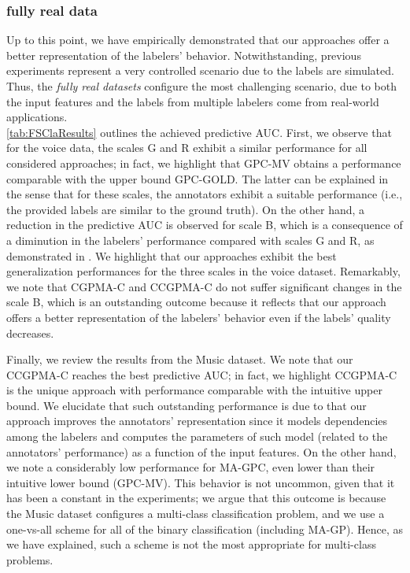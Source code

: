 \documentclass[journal]{IEEEtran}
\begin{document}
\subsubsection{fully real data}
Up to this point, we have empirically demonstrated that our approaches offer a better representation of the labelers’ behavior. Notwithstanding, previous experiments represent a very controlled scenario due to the labels are simulated. Thus, the \emph{fully real datasets} configure the most challenging scenario, due to both the input features and the labels from multiple labelers come from real-world applications.\\
\cref{tab:FSClaResults} outlines the achieved predictive AUC. First, we observe that for the voice data, the scales G and R exhibit a similar performance for all considered approaches; in fact, we highlight that GPC-MV obtains a performance comparable with the upper bound GPC-GOLD. The latter can be explained in the sense that for these scales, the annotators exhibit a suitable performance (i.e., the provided labels are similar to the ground truth). On the other hand, a reduction in the predictive AUC is observed for scale B, which is a consequence of a diminution in the labelers' performance compared with scales G and R, as demonstrated in \cite{gonzalez2015automatic}. We highlight that our approaches exhibit the best generalization performances for the three scales in the voice dataset. Remarkably, we note that CGPMA-C and CCGPMA-C do not suffer significant changes in the scale B, which is an outstanding outcome because it reflects that our approach offers a better representation of the labelers’ behavior even if the labels' quality decreases.

Finally, we review the results from the Music dataset. We note that our CCGPMA-C reaches the best predictive AUC; in fact, we highlight CCGPMA-C is the unique approach with performance comparable with the intuitive upper bound. We elucidate that such outstanding performance is due to that our approach improves the annotators' representation since it models dependencies among the labelers and computes the parameters of such model (related to the annotators' performance) as a function of the input features. On the other hand, we note a considerably low performance for MA-GPC, even lower than their intuitive lower bound (GPC-MV). This behavior is not uncommon, given that it has been a constant in the experiments; we argue that this outcome is because the Music dataset configures a multi-class classification problem, and we use a one-vs-all scheme for all of the binary classification (including MA-GP). Hence, as we have explained, such a scheme is not the most appropriate for multi-class problems.
\end{document}
